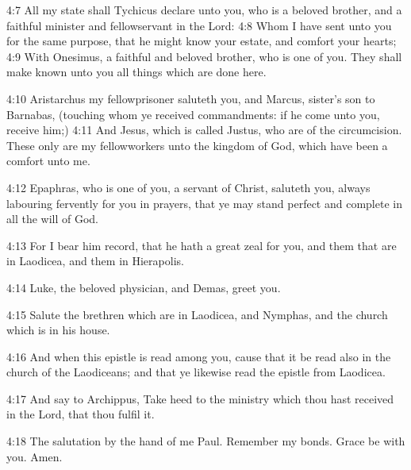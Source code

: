 4:7  All my state shall Tychicus declare unto you, who is a beloved
brother, and a faithful minister and fellowservant in the Lord:
4:8  Whom I have sent unto you for the same purpose, that he might know
your estate, and comfort your hearts;
4:9  With Onesimus, a faithful and beloved brother, who is one of you. They
shall make known unto you all things which are done here.

4:10  Aristarchus my fellowprisoner saluteth you, and Marcus, sister's son
to Barnabas, (touching whom ye received commandments: if he come unto you,
receive him;)
4:11  And Jesus, which is called Justus, who are of the circumcision. These
only are my fellowworkers unto the kingdom of God, which have been a comfort
unto me.

4:12  Epaphras, who is one of you, a servant of Christ, saluteth you,
always labouring fervently for you in prayers, that ye may stand perfect and
complete in all the will of God.

4:13  For I bear him record, that he hath a great zeal for you, and them
that are in Laodicea, and them in Hierapolis.

4:14  Luke, the beloved physician, and Demas, greet you.

4:15  Salute the brethren which are in Laodicea, and Nymphas, and the
church which is in his house.

4:16  And when this epistle is read among you, cause that it be read also
in the church of the Laodiceans; and that ye likewise read the epistle from
Laodicea.

4:17  And say to Archippus, Take heed to the ministry which thou hast
received in the Lord, that thou fulfil it.

4:18  The salutation by the hand of me Paul. Remember my bonds. Grace be
with you. Amen.

